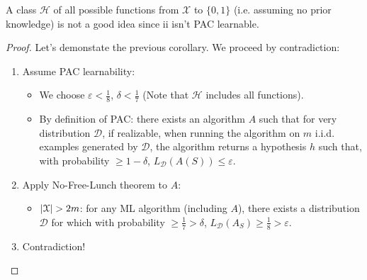 \documentclass[../../main/main.tex]{subfiles}
\begin{document}
\begin{remark}
    A class \( \mathcal{H} \) of all possible functions from \( \mathcal{X} \) to \( \{0,1\} \) (i.e. assuming no prior knowledge) is not a good idea since ii isn't PAC learnable.
\end{remark}

\begin{proof}
    Let's demonstate the previous corollary. We proceed by contradiction:
    \begin{enumerate}
        \item Assume PAC learnability:
            \begin{itemize}
                \item We choose \( \varepsilon < \frac{1}{8} \), \( \delta < \frac{1}{7} \) (Note that \( \mathcal{H} \) includes all functions).
                \item By definition of PAC: there exists an algorithm \( A \) such that for very distribution \( \mathcal{D} \), if realizable, when running the algorithm on \( m \) i.i.d. examples generated by \( \mathcal{D} \), the algorithm returns a hypothesis \( h \) such that, with probability \( \ge 1 - \delta \), \( L_{\mathcal{D}}(A(S)) \le \varepsilon \).
            \end{itemize}

        \item Apply No-Free-Lunch theorem to \( A \):
            \begin{itemize}
                \item \( \abs{\mathcal{X}} > 2m \): for any ML algorithm (including \( A \)), there exists a distribution \( \mathcal{D} \) for which with probability \( \ge \frac{1}{7} > \delta \), \( L_{\mathcal{D}}(A_S) \ge \frac{1}{8} > \varepsilon \).
            \end{itemize}

        \item Contradiction!
    \end{enumerate}
\end{proof}
\end{document}
